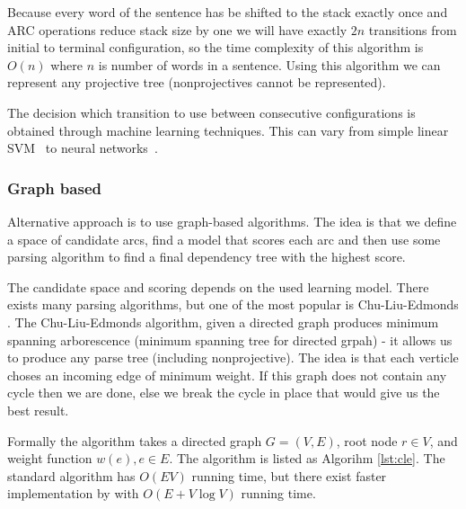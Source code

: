 Because every word of the sentence has be shifted to the stack exactly once
and {\ttfamily ARC} operations reduce stack size by one we will have exactly
$2n$ transitions from initial to terminal configuration, so the time complexity of this
algorithm is $O(n)$ where $n$ is number of words in a sentence.
Using this algorithm we can represent any projective tree 
\cite{nivre_algorithms_2008} (nonprojectives cannot be represented).

The decision which transition to use between consecutive configurations is
obtained through machine learning techniques. This can vary from simple
linear SVM~\cite{nivre_maltparser:_2005} to neural networks~\cite{chen_fast_2014,
andor_globally_2016}.

\subsubsection{Graph based}
Alternative approach is to use graph-based algorithms. The idea is that we define
a space of candidate arcs, find a model that scores each arc and then use some parsing
algorithm to find a final dependency tree with the highest score.

The candidate space and scoring depends on the used learning model.
There exists many parsing algorithms, but one of the most popular is
Chu-Liu-Edmonds \cite{edmonds_optimim_1966}.
The Chu-Liu-Edmonds algorithm, given a directed graph produces minimum spanning
arborescence (minimum spanning tree for directed grpah) - it allows us to produce
any parse tree (including nonprojective). The idea is that each verticle choses
an incoming edge of minimum weight. If this graph does not contain any cycle then
we are done, else we break the cycle in place that would give us the best result.

Formally the algorithm takes a directed graph $G = (V,E)$, root node $r \in V$,
and weight function $w(e), e \in E$. The algorithm is listed as Algorihm \ref{lst:cle}. 
The standard algorithm has $O(EV)$ running time, but there exist faster implementation
by \cite{gabow_efficient_1986} with $O(E + V\log V)$ running time.


